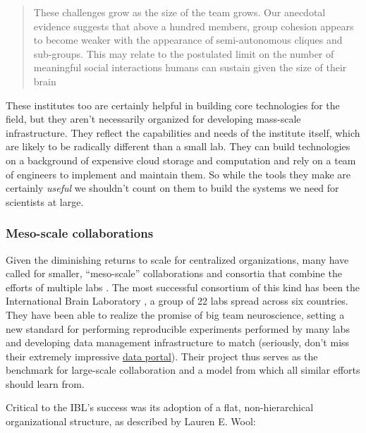 \documentclass[10pt]{article}
\begin{document}
\begin{multicols}{2}
\begin{quote}
These challenges grow as the size of the team grows. Our anecdotal
evidence suggests that above a hundred members, group cohesion appears
to become weaker with the appearance of semi-autonomous cliques and
sub-groups. This may relate to the postulated limit on the number of
meaningful social interactions humans can sustain given the size of
their brain \cite{kochBigScienceTeam2016} 
\end{quote}

These institutes too are certainly helpful in building core technologies
for the field, but they aren't necessarily organized for developing
mass-scale infrastructure. They reflect the capabilities and needs of
the institute itself, which are likely to be radically different than a
small lab. They can build technologies on a background of expensive
cloud storage and computation and rely on a team of engineers to
implement and maintain them. So while the tools they make are certainly
\emph{useful} we shouldn't count on them to build the systems we need
for scientists at large.

\hypertarget{meso-scale-collaborations}{%
\subsubsection{Meso-scale
collaborations}\label{meso-scale-collaborations}}

Given the diminishing returns to scale for centralized organizations,
many have called for smaller, ``meso-scale'' collaborations and
consortia that combine the efforts of multiple labs \cite{mainenBetterWayCrack2016} . The most successful consortium of this
kind has been the International Brain Laboratory \cite{abbottInternationalLaboratorySystems2017, woolKnowledgeNetworksHow2020} , a group of 22 labs spread across six countries. They have been
able to realize the promise of big team neuroscience, setting a new
standard for performing reproducible experiments performed by many labs
\cite{laboratoryStandardizedReproducibleMeasurement2020}  and
developing data management infrastructure to match \cite{laboratoryDataArchitectureLargescale2020}  (seriously, don't miss
their extremely impressive
\href{https://data.internationalbrainlab.org/}{data portal}). Their
project thus serves as the benchmark for large-scale collaboration and a
model from which all similar efforts should learn from.

Critical to the IBL's success was its adoption of a flat,
non-hierarchical organizational structure, as described by Lauren E.
Wool:


\end{multicols}
\end{document}
